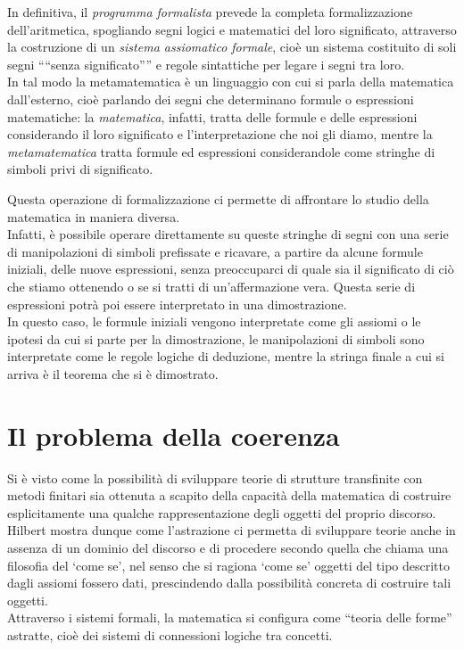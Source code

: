 In definitiva, il \emph{programma formalista} prevede la completa formalizzazione dell'aritmetica, spogliando segni logici e matematici del loro significato, attraverso la costruzione di un {\em sistema assiomatico formale}, cioè un sistema costituito di soli segni "`"`senza significato"'"' e regole sintattiche per legare i segni tra loro.\\
In tal modo la metamatematica è un linguaggio con cui si parla della matematica dall'esterno, cioè parlando dei segni che determinano formule o espressioni ma\-te\-ma\-ti\-che: la \emph{matematica}, infatti, tratta delle formule e delle espressioni considerando il loro significato e l'interpretazione che noi gli diamo, mentre la \emph{metamatematica} tratta formule ed espressioni considerandole come stringhe di simboli privi di significato.

Questa operazione di formalizzazione ci permette di affrontare lo studio della matematica in maniera diversa.\\
Infatti, è possibile operare direttamente su queste stringhe di segni con una serie di manipolazioni di simboli prefissate e ricavare, a partire da alcune formule iniziali, delle nuove espressioni, senza preoccuparci di quale sia il significato di ciò che stiamo ottenendo o se si tratti di un'affermazione vera. Questa serie di espressioni potrà poi essere interpretato in una dimostrazione.\\
In questo caso, le formule iniziali vengono interpretate come gli assiomi o le ipotesi da cui si parte per la dimostrazione, le manipolazioni di simboli sono interpretate come le regole logiche di deduzione, mentre la stringa finale a cui si arriva è il teorema che si è dimostrato. 



\section{Il problema della coerenza}

Si è visto come la possibilità di sviluppare teorie di strutture transfinite con metodi finitari sia ottenuta a scapito della capacità della matematica di costruire esplicitamente una qualche rappresentazione degli oggetti del proprio discorso.\\
Hilbert mostra dunque come l'astrazione ci permetta di sviluppare teorie anche in assenza di un dominio del discorso e di procedere secondo quella che chiama una filosofia del `come se', nel senso che si ragiona `come se' oggetti del tipo descritto dagli assiomi fossero dati, prescindendo dalla possibilità concreta di costruire tali oggetti.\\
Attraverso i sistemi formali, la matematica si configura come ``teoria delle forme'' astratte, cioè dei sistemi di connessioni logiche tra concetti.

